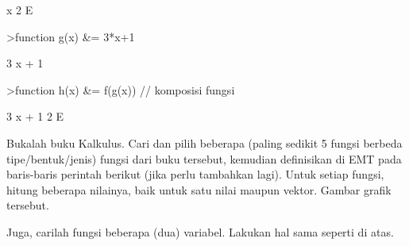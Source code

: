 \documentclass[a4paper,10pt]{article}
\begin{document}
\begin{eulernotebook}
\begin{eulercomment}
\begin{eulercomment}
\begin{eulercomment}
\begin{eulercomment}
\begin{eulercomment}
\begin{eulercomment}
\begin{eulercomment}
\begin{eulercomment}
\begin{eulercomment}
\begin{eulercomment}
\begin{euleroutput}
                                      x
                                   2 E
  
\end{euleroutput}
\begin{eulerprompt}
>function g(x) &= 3*x+1
\end{eulerprompt}
\begin{euleroutput}
  
                                 3 x + 1
  
\end{euleroutput}
\begin{eulerprompt}
>function h(x) &= f(g(x)) // komposisi fungsi
\end{eulerprompt}
\begin{euleroutput}
  
                                   3 x + 1
                                2 E
  
\end{euleroutput}
\begin{eulercomment}
Bukalah buku Kalkulus. Cari dan pilih beberapa (paling sedikit 5
fungsi berbeda tipe/bentuk/jenis) fungsi dari buku tersebut, kemudian
definisikan di EMT pada baris-baris perintah berikut (jika perlu
tambahkan lagi). Untuk setiap fungsi, hitung beberapa nilainya, baik
untuk satu nilai maupun vektor. Gambar grafik tersebut.

Juga, carilah fungsi beberapa (dua) variabel. Lakukan hal sama seperti
di atas.


\end{eulercomment}
\end{eulercomment}
\end{eulercomment}
\end{eulercomment}
\end{eulercomment}
\end{eulercomment}
\end{eulercomment}
\end{eulercomment}
\end{eulercomment}
\end{eulercomment}
\end{eulercomment}
\end{eulernotebook}
\end{document}
